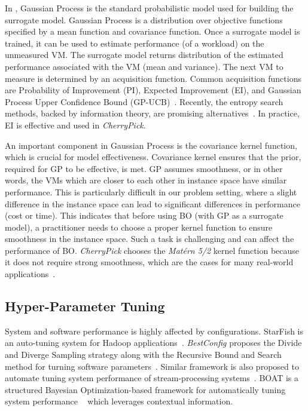 In \bo, Gaussian Process is
the standard probabilistic model used for building the surrogate model.
Gaussian Process is a distribution over objective functions specified by a
mean function and covariance function.
Once a surrogate model is trained, it can be used to estimate performance (of a workload) on the unmeasured VM. The surrogate model returns distribution of the estimated performance associated with the VM (mean and variance). The next VM to measure is determined by an acquisition function. Common acquisition functions are Probability of Improvement (PI),
Expected Improvement (EI), and Gaussian Process Upper Confidence Bound (GP-UCB)~\cite{shahriari2016taking}.
Recently, the entropy search methods, backed by information theory, are promising alternatives~\cite{pmlr-v70-wang17e}.
In practice, EI is effective and used in \emph{CherryPick}.

An important component in Gaussian Process is the covariance kernel function, which is crucial for model effectiveness. Covariance kernel ensures that the prior, required for GP to be effective, is met. GP assumes smoothness, or in other words, the VMs which are closer to each other in instance space have similar performance.
This is particularly difficult in our problem setting, where a slight difference in the instance space can lead to significant differences in performance (cost or time). 
This indicates that before using BO (with GP as a surrogate model), a practitioner needs to choose a proper kernel function to ensure smoothness in the instance space.
Such a task is challenging and can affect the performance of BO. \emph{CherryPick} chooses the \emph{Mat\'ern 5/2} kernel function because it does not require strong smoothness, which are the cases for many real-world applications~\cite{Alipourfard2017,Yadwadkar2017}.


\subsection{Hyper-Parameter Tuning}

System and software performance is highly affected by configurations.
StarFish is an auto-tuning system for Hadoop applications~\cite{herodotou2011starfish}.
\emph{BestConfig} proposes the Divide and Diverge Sampling strategy along with the Recursive Bound and Search method
for turning software parameters~\cite{zhu2017bestconfig}.
Similar framework is also proposed to automate tuning system performance
of stream-processing systems~\cite{bilal2017towards}.
BOAT is a structured Bayesian Optimization-based framework for automatically tuning system performance
~\cite{Dalibard2017} which leverages contextual information.

